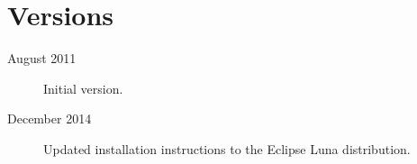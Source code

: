 \section*{Versions}


\begin{description}
\item[August 2011] Initial version.
\item[December 2014] Updated installation instructions to the Eclipse Luna distribution.
\end{description}